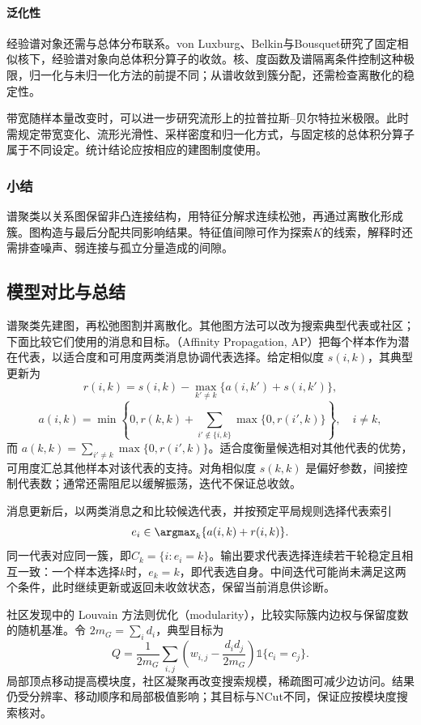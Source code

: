 \paragraph{泛化性}
经验谱对象还需与总体分布联系。von Luxburg、Belkin与Bousquet研究了固定相似核下，经验谱对象向总体积分算子的收敛。核、度函数及谱隔离条件控制这种极限，归一化与未归一化方法的前提不同；从谱收敛到簇分配，还需检查离散化的稳定性。

带宽随样本量改变时，可以进一步研究流形上的拉普拉斯--贝尔特拉米极限。此时需规定带宽变化、流形光滑性、采样密度和归一化方式，与固定核的总体积分算子属于不同设定。统计结论应按相应的建图制度使用。

\subsubsection{小结}

谱聚类以关系图保留非凸连接结构，用特征分解求连续松弛，再通过离散化形成簇。图构造与最后分配共同影响结果。特征值间隙可作为探索$K$的线索，解释时还需排查噪声、弱连接与孤立分量造成的间隙。

\subsection{模型对比与总结}

谱聚类先建图，再松弛图割并离散化。其他图方法可以改为搜索典型代表或社区；下面比较它们使用的消息和目标。（Affinity Propagation, AP）把每个样本作为潜在代表，以适合度和可用度两类消息协调代表选择。给定相似度 $s(i,k)$，其典型更新为
\[
 r(i,k)=s(i,k)-\max_{k'\ne k}\{a(i,k')+s(i,k')\},
\]
\[
 a(i,k)=
 \min\left\{0,r(k,k)+
 \sum_{i'\notin\{i,k\}}\max\{0,r(i',k)\}\right\},
 \quad i\ne k,
\]
而 $a(k,k)=\sum_{i'\ne k}\max\{0,r(i',k)\}$。适合度衡量候选相对其他代表的优势，可用度汇总其他样本对该代表的支持。对角相似度 $s(k,k)$ 是偏好参数，间接控制代表数；通常还需阻尼以缓解振荡，迭代不保证总收敛。

消息更新后，以两类消息之和比较候选代表，并按预定平局规则选择代表索引
\[
 e_i\in\argmax_k\{a(i,k)+r(i,k)\}.
\]
同一代表对应同一簇，即$C_k=\{i:e_i=k\}$。输出要求代表选择连续若干轮稳定且相互一致：一个样本选择$k$时，$e_k=k$，即代表选自身。中间迭代可能尚未满足这两个条件，此时继续更新或返回未收敛状态，保留当前消息供诊断。

社区发现中的 Louvain 方法则优化（modularity），比较实际簇内边权与保留度数的随机基准。令 $2m_G=\sum_i d_i$，典型目标为
\[
 Q=\frac{1}{2m_G}\sum_{i,j}
 \left(w_{i,j}-\frac{d_i d_j}{2m_G}\right)
 \mathbb{1}\{c_i=c_j\}.
\]
局部顶点移动提高模块度，社区凝聚再改变搜索规模，稀疏图可减少边访问。结果仍受分辨率、移动顺序和局部极值影响；其目标与NCut不同，保证应按模块度搜索核对。

